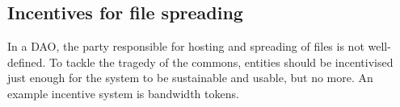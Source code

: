 \subsection{Incentives for file spreading}
In a DAO, the party responsible for hosting and spreading of files is not well-defined. To tackle the tragedy of the commons, entities should be incentivised just enough for the system to be sustainable and usable, but no more. An example incentive system is bandwidth tokens\cite{Vos2018ABM}.